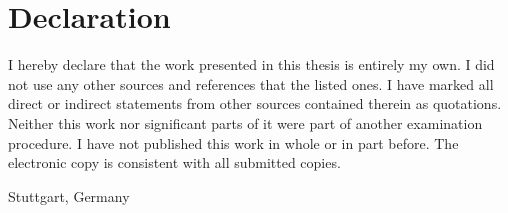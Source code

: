 \cleardoublepage
{}
\chapter*{Declaration}
%
%

I hereby declare that the work presented in this thesis is entirely my own.
I did not use any other sources and references that the listed ones. I have marked all direct or indirect
statements from other sources contained therein as quotations.
Neither this work nor significant parts of it were part of another examination procedure. I have not published
this work in whole or in part before.
The electronic copy is consistent with all submitted copies.

Stuttgart, Germany 

